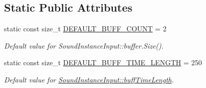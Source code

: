 \subsection*{Static Public Attributes}
\begin{DoxyCompactItemize}
\item 
\hypertarget{class_sound_instance_input_a54050bf057224ecd80fcfd496af22811}{
static const size\_\-t \hyperlink{class_sound_instance_input_a54050bf057224ecd80fcfd496af22811}{DEFAULT\_\-BUFF\_\-COUNT} = 2}
\label{class_sound_instance_input_a54050bf057224ecd80fcfd496af22811}

\begin{DoxyCompactList}\small\item\em Default value for SoundInstanceInput::buffer.Size(). \item\end{DoxyCompactList}\item 
\hypertarget{class_sound_instance_input_a4450bef5de3e1ac4cba2fa5773deea85}{
static const size\_\-t \hyperlink{class_sound_instance_input_a4450bef5de3e1ac4cba2fa5773deea85}{DEFAULT\_\-BUFF\_\-TIME\_\-LENGTH} = 250}
\label{class_sound_instance_input_a4450bef5de3e1ac4cba2fa5773deea85}

\begin{DoxyCompactList}\small\item\em Default value for \hyperlink{class_sound_instance_input_a137354d9a5e6153530b2627dbc402268}{SoundInstanceInput::buffTimeLength}. \item\end{DoxyCompactList}\end{DoxyCompactItemize}
